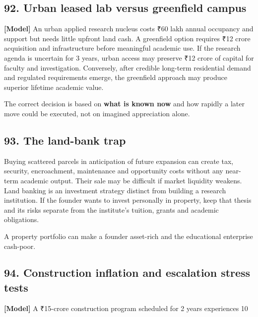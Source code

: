 \subsection{92. Urban leased lab versus greenfield campus}

\textbf{[Model]} An urban applied research nucleus costs \textnormal{₹}60 lakh annual occupancy and support but needs little upfront land cash. A greenfield option requires \textnormal{₹}12 crore acquisition and infrastructure before meaningful academic use. If the research agenda is uncertain for 3 years, urban access may preserve \textnormal{₹}12 crore of capital for faculty and investigation. Conversely, after credible long-term residential demand and regulated requirements emerge, the greenfield approach may produce superior lifetime academic value.

The correct decision is based on \textbf{what is known now} and how rapidly a later move could be executed, not on imagined appreciation alone.


\subsection{93. The land-bank trap}

Buying scattered parcels in anticipation of future expansion can create tax, security, encroachment, maintenance and opportunity costs without any near-term academic output. Their sale may be difficult if market liquidity weakens. Land banking is an investment strategy distinct from building a research institution. If the founder wants to invest personally in property, keep that thesis and its risks separate from the institute's tuition, grants and academic obligations.

A property portfolio can make a founder asset-rich and the educational enterprise cash-poor.


\subsection{94. Construction inflation and escalation stress tests}

\textbf{[Model]} A \textnormal{₹}15-crore construction program scheduled for 2 years experiences 10%

